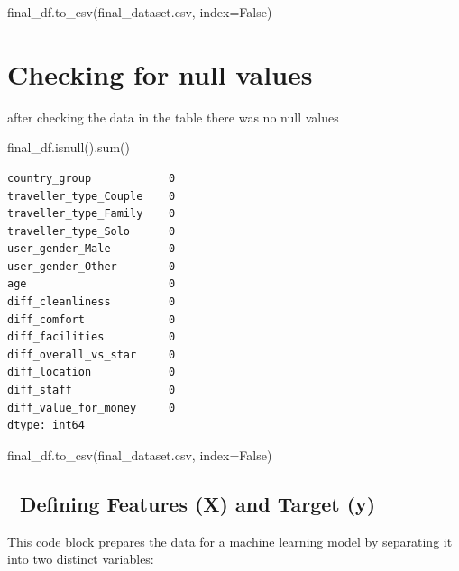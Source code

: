 \documentclass[
  letterpaper,
  DIV=11,
  numbers=noendperiod]{scrartcl}
\newenvironment{Shaded}{\begin{snugshade}}{\end{snugshade}}
\newcommand{\BuiltInTok}[1]{\textcolor[rgb]{0.00,0.23,0.31}{#1}}
\newcommand{\NormalTok}[1]{\textcolor[rgb]{0.00,0.23,0.31}{#1}}
\newcommand{\OperatorTok}[1]{\textcolor[rgb]{0.37,0.37,0.37}{#1}}
\newcommand{\StringTok}[1]{\textcolor[rgb]{0.13,0.47,0.30}{#1}}
\newcommand{\VariableTok}[1]{\textcolor[rgb]{0.07,0.07,0.07}{#1}}
\begin{document}
\begin{Shaded}
\begin{Highlighting}[]
\NormalTok{final\_df.to\_csv(}\StringTok{\textquotesingle{}final\_dataset.csv\textquotesingle{}}\NormalTok{, index}\OperatorTok{=}\VariableTok{False}\NormalTok{)}
\end{Highlighting}
\end{Shaded}

\section{Checking for null values}\label{checking-for-null-values}

after checking the data in the table there was no null values

\begin{Shaded}
\begin{Highlighting}[]
\NormalTok{final\_df.isnull().}\BuiltInTok{sum}\NormalTok{()}
\end{Highlighting}
\end{Shaded}

\begin{verbatim}
country_group            0
traveller_type_Couple    0
traveller_type_Family    0
traveller_type_Solo      0
user_gender_Male         0
user_gender_Other        0
age                      0
diff_cleanliness         0
diff_comfort             0
diff_facilities          0
diff_overall_vs_star     0
diff_location            0
diff_staff               0
diff_value_for_money     0
dtype: int64
\end{verbatim}

\begin{Shaded}
\begin{Highlighting}[]
\NormalTok{final\_df.to\_csv(}\StringTok{\textquotesingle{}final\_dataset.csv\textquotesingle{}}\NormalTok{, index}\OperatorTok{=}\VariableTok{False}\NormalTok{)}
\end{Highlighting}
\end{Shaded}

\subsection{🎯 Defining Features (X) and Target
(y)}\label{defining-features-x-and-target-y}

This code block prepares the data for a machine learning model by
separating it into two distinct variables:
\end{document}
